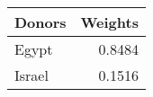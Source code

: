 \begin{tabular}{lr}
\toprule
Donors &  Weights \\
\midrule
 Egypt &   0.8484 \\
Israel &   0.1516 \\
\bottomrule
\end{tabular}
